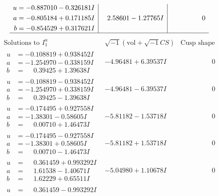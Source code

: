 \documentclass[1p]{elsarticle_modified}
\theoremstyle{definition}
\newcommand{\I}{\sqrt{-1}}
\begin{document}
$$\begin{array}{c|c|c}
\begin{aligned}
u &= -0.887010 - 0.326181 I \\
a &= -0.805184 + 0.171185 I \\
b &= -0.854529 + 0.317621 I\end{aligned}
 & \phantom{-}2.58601 - 1.27765 I & \phantom{-0.000000 } 0\\
 \hline 
 \end{array}$$\newpage$$\begin{array}{c|c|c}  
\text{Solutions to }I^u_{1}& \I (\text{vol} + \sqrt{-1}CS) & \text{Cusp shape}\\
 \hline 
\begin{aligned}
u &= -0.108819 + 0.938452 I \\
a &= -1.254970 - 0.338159 I \\
b &= \phantom{-}0.39425 + 1.39638 I\end{aligned}
 & -4.96481 + 6.39537 I & \phantom{-0.000000 } 0 \\ \hline\begin{aligned}
u &= -0.108819 - 0.938452 I \\
a &= -1.254970 + 0.338159 I \\
b &= \phantom{-}0.39425 - 1.39638 I\end{aligned}
 & -4.96481 - 6.39537 I & \phantom{-0.000000 } 0 \\ \hline\begin{aligned}
u &= -0.174495 + 0.927558 I \\
a &= -1.38301 - 0.58605 I \\
b &= \phantom{-}0.00710 + 1.46473 I\end{aligned}
 & -5.81182 - 1.53718 I & \phantom{-0.000000 } 0 \\ \hline\begin{aligned}
u &= -0.174495 - 0.927558 I \\
a &= -1.38301 + 0.58605 I \\
b &= \phantom{-}0.00710 - 1.46473 I\end{aligned}
 & -5.81182 + 1.53718 I & \phantom{-0.000000 } 0 \\ \hline\begin{aligned}
u &= \phantom{-}0.361459 + 0.993292 I \\
a &= \phantom{-}1.61538 - 1.40671 I \\
b &= \phantom{-}1.62229 + 0.65511 I\end{aligned}
 & -5.04980 + 1.10678 I & \phantom{-0.000000 } 0 \\ \hline\begin{aligned}
u &= \phantom{-}0.361459 - 0.993292 I \\

\end{aligned}
\end{array}$$
\end{document}
